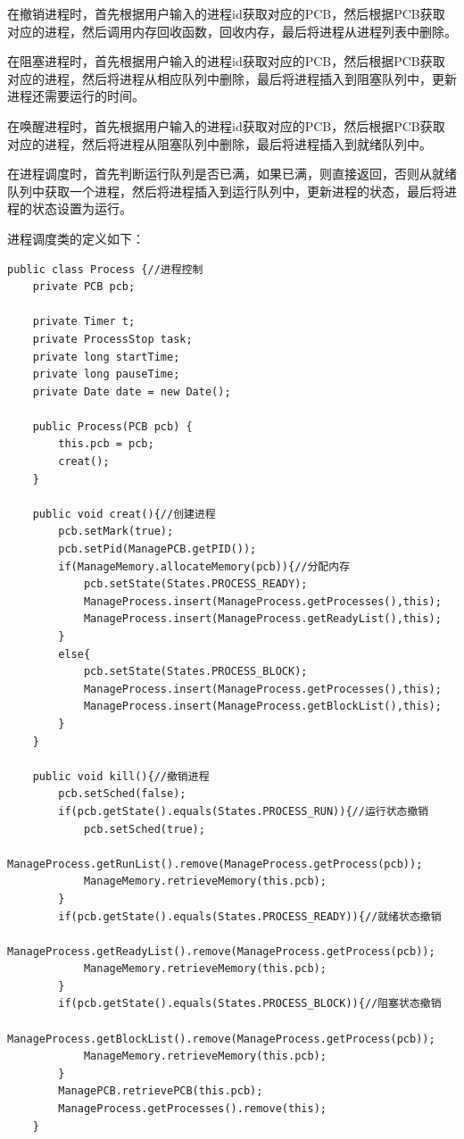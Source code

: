 \documentclass[UTF8,12pt]{article}
\begin{document}
在撤销进程时，首先根据用户输入的进程id获取对应的PCB，然后根据PCB获取对应的进程，然后调用内存回收函数，回收内存，最后将进程从进程列表中删除。

在阻塞进程时，首先根据用户输入的进程id获取对应的PCB，然后根据PCB获取对应的进程，然后将进程从相应队列中删除，最后将进程插入到阻塞队列中，更新进程还需要运行的时间。

在唤醒进程时，首先根据用户输入的进程id获取对应的PCB，然后根据PCB获取对应的进程，然后将进程从阻塞队列中删除，最后将进程插入到就绪队列中。

在进程调度时，首先判断运行队列是否已满，如果已满，则直接返回，否则从就绪队列中获取一个进程，然后将进程插入到运行队列中，更新进程的状态，最后将进程的状态设置为运行。

进程调度类的定义如下：
\begin{lstlisting}[title=进程调度类定义,frame=shadowbox]
    public class Process {//进程控制
    private PCB pcb;

    private Timer t;
    private ProcessStop task;
    private long startTime;
    private long pauseTime;
    private Date date = new Date();

    public Process(PCB pcb) {
        this.pcb = pcb;
        creat();
    }

    public void creat(){//创建进程
        pcb.setMark(true);
        pcb.setPid(ManagePCB.getPID());
        if(ManageMemory.allocateMemory(pcb)){//分配内存
            pcb.setState(States.PROCESS_READY);
            ManageProcess.insert(ManageProcess.getProcesses(),this);
            ManageProcess.insert(ManageProcess.getReadyList(),this);
        }
        else{
            pcb.setState(States.PROCESS_BLOCK);
            ManageProcess.insert(ManageProcess.getProcesses(),this);
            ManageProcess.insert(ManageProcess.getBlockList(),this);
        }
    }

    public void kill(){//撤销进程
        pcb.setSched(false);
        if(pcb.getState().equals(States.PROCESS_RUN)){//运行状态撤销
            pcb.setSched(true);
            ManageProcess.getRunList().remove(ManageProcess.getProcess(pcb));
            ManageMemory.retrieveMemory(this.pcb);
        }
        if(pcb.getState().equals(States.PROCESS_READY)){//就绪状态撤销
            ManageProcess.getReadyList().remove(ManageProcess.getProcess(pcb));
            ManageMemory.retrieveMemory(this.pcb);
        }
        if(pcb.getState().equals(States.PROCESS_BLOCK)){//阻塞状态撤销
            ManageProcess.getBlockList().remove(ManageProcess.getProcess(pcb));
            ManageMemory.retrieveMemory(this.pcb);
        }
        ManagePCB.retrievePCB(this.pcb);
        ManageProcess.getProcesses().remove(this);
    }


\end{lstlisting}
\end{document}
